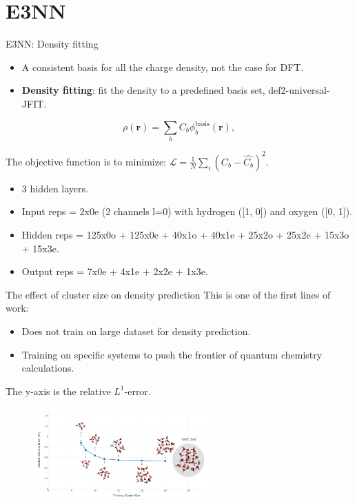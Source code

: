\section{E3NN}

\begin{frame}{E3NN: Density fitting}
  \begin{itemize}
    \item A consistent basis for all the charge density, not the case for DFT.
    \item {\color{red} \textbf{Density fitting}}: fit the density to a predefined basis set, def2-universal-JFIT\footnotemark.
  \end{itemize}
  \begin{equation*}
    \rho(\mathbf{r}) = \sum_b C_b \phi_b^{\text{basis}}(\mathbf{r}),
  \end{equation*}

  The objective function is to minimize:
    $\mathcal{L} = \frac{1}{N} \sum_i \left(C_b - \widehat{C_b}\right)^2$.
  \begin{itemize}
    \item 3 hidden layers.
    \item Input reps = 2x0e (2 channels l=0) with hydrogen ([1, 0])
    and oxygen ([0, 1]).
    \item Hidden reps = 125x0o + 125x0e + 40x1o + 40x1e + 25x2o + 25x2e + 15x3o + 15x3e.
    \item Output reps = 7x0e + 4x1e + 2x2e + 1x3e.
  \end{itemize}

\end{frame}


\begin{frame}{The effect of cluster size on density prediction}
  This is one of the first lines of work:
  \begin{itemize}
    \item Does not train on large dataset for density prediction.
    \item Training on specific systems to push the frontier of quantum chemistry
    calculations.
  \end{itemize}
  The y-axis is the relative $L^1$-error.
  \begin{figure}
    \includegraphics[width=0.6\textwidth]{figures/e3nn_2.jpg}
  \end{figure}
\end{frame}
